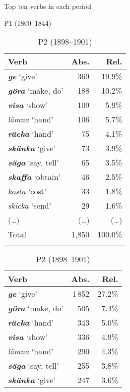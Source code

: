 \documentclass[output=paper]{langscibook}
\begin{document}
\begin{table}
\caption{Top ten verbs in each period\label{tab:valdeson:5}}
\begin{subtable}{.5\linewidth}\centering
\caption{P1 (1800–1844)}
\begin{tabularx}{\linewidth}{Xrr}
\lsptoprule
Verb & Abs.   & Rel.   \\
\midrule
\textbf{\textit{ge}} ‘give’             & 369 & 19.9\%    \\
\textbf{\textit{göra}} ‘make, do’       & 188 & 10.2\%    \\
\textbf{\textit{visa}} ‘show’           & 109 & 5.9\%     \\
\textit{lämna} ‘hand’                   & 106 & 5.7\%     \\
\textbf{\textit{räcka}} ‘hand’          & 75 & 4.1\%      \\
\textbf{\textit{skänka}} ‘give’         & 73 & 3.9\%      \\
\textbf{\textit{säga}} ‘say, tell’      & 65 & 3.5\%      \\
\textbf{\textit{skaffa}} ‘obtain’       & 46 & 2.5\%      \\
\textit{kosta} ‘cost’                   & 33 & 1.8\%      \\
\textit{skicka} ‘send’                  & 29 & 1.6\%      \\
(…) & (…) & (…) \\
\midrule
Total & 1,850 & 100.0\%  \\
\lspbottomrule
\end{tabularx}
\end{subtable}\begin{subtable}{.5\linewidth}\centering
\caption{P2 (1898–1901)}
\begin{tabularx}{\linewidth}{Xrr}
\lsptoprule
Verb & Abs.   & Rel.   \\
\midrule
 \textbf{\textit{ge}} ‘give’         & 1\,852 & 27.2\%    \\
 \textbf{\textit{göra}} ‘make, do’   & 505 & 7.4\%       \\
 \textbf{\textit{räcka}} ‘hand’      & 343 & 5.0\%       \\
 \textbf{\textit{visa}} ‘show’       & 336 & 4.9\%       \\
 \textit{lämna} ‘hand’               & 290 & 4.3\%       \\
 \textbf{\textit{säga}} ‘say, tell’  & 255 & 3.8\%       \\
 \textbf{\textit{skänka}} ‘give’    & 247 & 3.6\%        \\

\end{tabularx}
\end{subtable}
\end{table}
\end{document}
